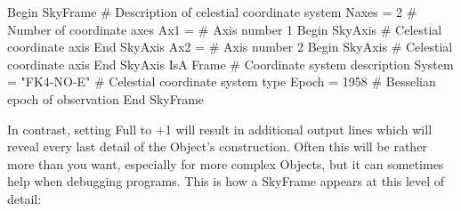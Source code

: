 \documentclass[twoside,11pt]{starlink}
\begin{document}
{\small
\begin{terminalv}
 Begin SkyFrame 	# Description of celestial coordinate system
    Naxes = 2 	# Number of coordinate axes
    Ax1 = 	# Axis number 1
       Begin SkyAxis 	# Celestial coordinate axis
       End SkyAxis
    Ax2 = 	# Axis number 2
       Begin SkyAxis 	# Celestial coordinate axis
       End SkyAxis
 IsA Frame 	# Coordinate system description
    System = "FK4-NO-E" 	# Celestial coordinate system type
    Epoch = 1958 	# Besselian epoch of observation
 End SkyFrame
\end{terminalv}
\normalsize

In contrast, setting Full to $+$1 will result in additional output
lines which will reveal every last detail of the Object's
construction. Often this will be rather more than you want, especially
for more complex Objects, but it can sometimes help when debugging
programs. This is how a SkyFrame appears at this level of detail:

}
\end{document}

